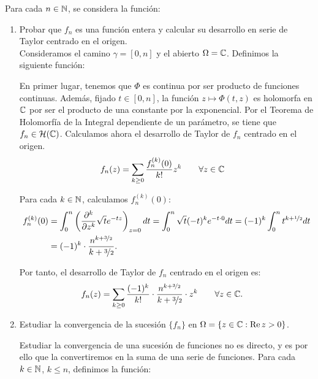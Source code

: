 \begin{ejercicio}
    Para cada $n\in\mathbb{N}$, se considera la función:
    \begin{enumerate}
        \item Probar que $f_n$ es una función entera y calcular su desarrollo en serie de Taylor centrado en el origen.\\
        
        Consideramos el camino $\gamma = [0,n]$ y el abierto $\Omega = \mathbb{C}$. Definimos la siguiente función:

        En primer lugar, tenemos que $\Phi$ es continua por ser producto de funciones continuas. Además, fijado $t\in[0,n]$, la función $z\mapsto \Phi(t,z)$ es holomorfa en $\mathbb{C}$ por ser el producto de una constante por la exponencial. Por el Teorema de Holomorfía de la Integral dependiente de un parámetro, se tiene que $f_n\in \mathcal{H}(\mathbb{C})$. Calculamos ahora el desarrollo de Taylor de $f_n$ centrado en el origen.
        \begin{align*}
            f_n(z) &= \sum_{k\geq 0} \dfrac{f_n^{(k)}(0)}{k!} z^k\qquad \forall z\in\mathbb{C}
        \end{align*}
        
        Para cada $k\in\mathbb{N}$, calculamos $f_n^{(k)}(0)$:
        \begin{align*}
            f_n^{(k)}(0) &= \int_0^n \left(\dfrac{\partial^{k}}{\partial z^k} \sqrt{t} e^{-tz}\right)_{z=0} dt
            = \int_0^n \sqrt{t} (-t)^k e^{-t\cdot 0} dt
            = (-1)^k \int_0^n t^{k+\nicefrac{1}{2}} dt\\
            &= (-1)^k \cdot \dfrac{n^{k+\nicefrac{3}{2}}}{k+\nicefrac{3}{2}}.
        \end{align*}

        Por tanto, el desarrollo de Taylor de $f_n$ centrado en el origen es:
        \begin{align*}
            f_n(z) &= \sum_{k\geq 0} \dfrac{(-1)^k}{k!} \cdot \dfrac{n^{k+\nicefrac{3}{2}}}{k+\nicefrac{3}{2}} \cdot z^k\qquad \forall z\in\mathbb{C}.
        \end{align*}
        

        \item Estudiar la convergencia de la sucesión $\{f_n\}$ en $\Omega = \{z\in\mathbb{C} : \operatorname{Re} z > 0\}$.
        
        Estudiar la convergencia de una sucesión de funciones no es directo, y es por ello que la convertiremos en la suma de una serie de funciones. Para cada $k\in \mathbb{N}$, $k\leq n$, definimos la función:


\end{enumerate}
\end{ejercicio}
